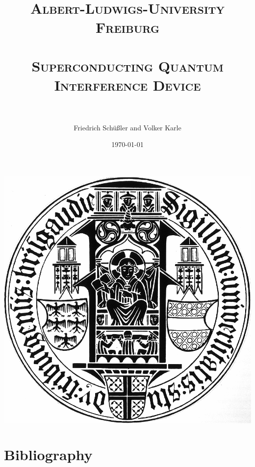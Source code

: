 \documentclass[paper=a4, fontsize=12pt, xcolor=dvipsnames]{scrartcl} %
\title{ 
\normalfont \normalsize 
\textsc{Albert-Ludwigs-University Freiburg} \\ [25pt] %
\horrule{0.5pt} \\[0.4cm] %
\huge \textsc{Superconducting Quantum Interference Device} \\ %
\horrule{2pt} \\[0.5cm] %
}
\author{Friedrich Schüßler and Volker Karle} %
\date{\normalsize\today} %
\numberwithin{equation}{section} %
\numberwithin{figure}{section} %
\numberwithin{table}{section} %
\begin{document}
\color{black}
\maketitle
\begin{center}
 \includegraphics[width=0.7\linewidth]{figures/unifreiburg}
\end{center}
\thispagestyle{empty}
\newpage
    {\pagestyle{plain}
    \thispagestyle{empty}
    \tableofcontents
    \thispagestyle{empty}
    \cleardoublepage}
\newpage



\setcounter{page}{1}



\clearpage

\section{Bibliography}
\printbibliography[heading=subbibintoc]
\clearpage
\end{document}
